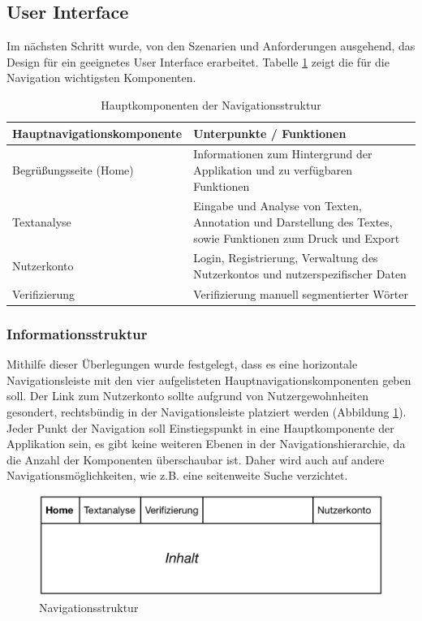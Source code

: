 \subsection{User Interface}
Im nächsten Schritt wurde, von den Szenarien und Anforderungen ausgehend, das Design für ein geeignetes User Interface erarbeitet. Tabelle \ref{table:navigation} zeigt die für die Navigation wichtigsten Komponenten.

\begin{table}[h!]
	\centering
	\begin{tabular}{|l|p{8cm}|}
		\hline
		Hauptnavigationskomponente & Unterpunkte / Funktionen \\
		\hline
		\hline
		Begrüßungsseite (Home) & Informationen zum Hintergrund der Applikation und zu verfügbaren Funktionen\\
		\hline
		Textanalyse & Eingabe und Analyse von Texten, Annotation und Darstellung des Textes, sowie Funktionen zum Druck und Export\\
		\hline
		Nutzerkonto & Login, Registrierung, Verwaltung des Nutzerkontos und nutzerspezifischer Daten \\
		\hline
		Verifizierung & Verifizierung manuell segmentierter Wörter \\
		\hline
	\end{tabular}
	\caption{Hauptkomponenten der Navigationsstruktur}
	\label{table:navigation}
\end{table}

\subsubsection{Informationsstruktur}

Mithilfe dieser Überlegungen wurde festgelegt, dass es eine horizontale Navigationsleiste mit den vier aufgelisteten Hauptnavigationskomponenten geben soll. Der Link zum Nutzerkonto sollte aufgrund von Nutzergewohnheiten gesondert, rechtsbündig in der Navigationsleiste platziert werden (Abbildung \ref{fig:navigation}). Jeder Punkt der Navigation soll Einstiegspunkt in eine Hauptkomponente der Applikation sein, es gibt keine weiteren Ebenen in der Navigationshierarchie, da die Anzahl der Komponenten überschaubar ist. Daher wird auch auf andere Navigationsmöglichkeiten, wie z.B. eine seitenweite Suche verzichtet.


\begin{figure}[h!]
	\centering
	\includegraphics[width=.8\linewidth]{figures/navigation}
	\caption{Navigationsstruktur}
	\label{fig:navigation}
\end{figure}

